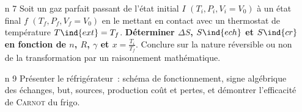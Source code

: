 \documentclass[a4paper, 10pt, final, garamond]{book}
\begin{document}
\begin{enumerate}[label=\sqenumi]
	\item[n]{7}
	Soit un gaz parfait passant de l'état initial $I$ $(T_i, P_i, V_i = V_0)$ à un
	état final $f$ $(T_f, P_f, V_f = V_0)$ en le mettant en contact avec un
	thermostat de température $T\ind{ext} = T_f$. \textbf{Déterminer
		$\Delta{S}$, $S\ind{ech}$ et $S\ind{cr}$ en fonction de $n$, $R$, $\gamma$
		et $x = \frac{T_i}{T_f}$}. Conclure sur la nature réversible ou non de la
	transformation par un raisonnement mathématique.
	\smallbreak
	\begin{isd}
		\tcblower
	\end{isd}
	\item[n]{9}
	Présenter le réfrigérateur~: schéma de fonctionnement, signe algébrique des
	échanges, but, sources, production coût et pertes, et démontrer l'efficacité
	de \textsc{Carnot} du frigo.
	\smallbreak
	\begin{isd}[righthand ratio=.3]
		\begin{isd}

\end{isd}
\end{isd}
\end{enumerate}
\end{document}
